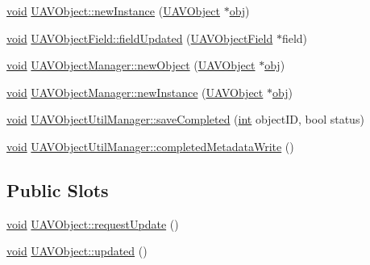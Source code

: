 \begin{DoxyCompactItemize}
\item 
\hyperlink{group___u_a_v_objects_plugin_ga444cf2ff3f0ecbe028adce838d373f5c}{void} \hyperlink{group___u_a_v_objects_plugin_gadf709e4ec60d0dfc3cc4a12012c400f3}{U\-A\-V\-Object\-::new\-Instance} (\hyperlink{class_u_a_v_object}{U\-A\-V\-Object} $\ast$\hyperlink{glext_8h_a0c0d4701a6c89f4f7f0640715d27ab26}{obj})
\item 
\hyperlink{group___u_a_v_objects_plugin_ga444cf2ff3f0ecbe028adce838d373f5c}{void} \hyperlink{group___u_a_v_objects_plugin_ga03a1f1534e4c805d091fc17e9ab5ad14}{U\-A\-V\-Object\-Field\-::field\-Updated} (\hyperlink{class_u_a_v_object_field}{U\-A\-V\-Object\-Field} $\ast$field)
\item 
\hyperlink{group___u_a_v_objects_plugin_ga444cf2ff3f0ecbe028adce838d373f5c}{void} \hyperlink{group___u_a_v_objects_plugin_gaf8c983e30ce7ebac3d4ef742d427b8fe}{U\-A\-V\-Object\-Manager\-::new\-Object} (\hyperlink{class_u_a_v_object}{U\-A\-V\-Object} $\ast$\hyperlink{glext_8h_a0c0d4701a6c89f4f7f0640715d27ab26}{obj})
\item 
\hyperlink{group___u_a_v_objects_plugin_ga444cf2ff3f0ecbe028adce838d373f5c}{void} \hyperlink{group___u_a_v_objects_plugin_ga7787ebe5de616d95116d5a4b360b6773}{U\-A\-V\-Object\-Manager\-::new\-Instance} (\hyperlink{class_u_a_v_object}{U\-A\-V\-Object} $\ast$\hyperlink{glext_8h_a0c0d4701a6c89f4f7f0640715d27ab26}{obj})
\item 
\hyperlink{group___u_a_v_objects_plugin_ga444cf2ff3f0ecbe028adce838d373f5c}{void} \hyperlink{group___u_a_v_objects_plugin_ga34993cd463a734315dd04903a4e2de24}{U\-A\-V\-Object\-Util\-Manager\-::save\-Completed} (\hyperlink{ioapi_8h_a787fa3cf048117ba7123753c1e74fcd6}{int} object\-I\-D, bool status)
\item 
\hyperlink{group___u_a_v_objects_plugin_ga444cf2ff3f0ecbe028adce838d373f5c}{void} \hyperlink{group___u_a_v_objects_plugin_gaf343ab5f4e4710c85cd7977ae7563ca1}{U\-A\-V\-Object\-Util\-Manager\-::completed\-Metadata\-Write} ()
\end{DoxyCompactItemize}
\subsection*{Public Slots}
\begin{DoxyCompactItemize}
\item 
\hyperlink{group___u_a_v_objects_plugin_ga444cf2ff3f0ecbe028adce838d373f5c}{void} \hyperlink{group___u_a_v_objects_plugin_ga6018820b37db308fb1ee1b3c3ff4f9a0}{U\-A\-V\-Object\-::request\-Update} ()
\item 
\hyperlink{group___u_a_v_objects_plugin_ga444cf2ff3f0ecbe028adce838d373f5c}{void} \hyperlink{group___u_a_v_objects_plugin_ga295ff9d6b0c01a6a8809a4cf9eb027cc}{U\-A\-V\-Object\-::updated} ()
\end{DoxyCompactItemize}


